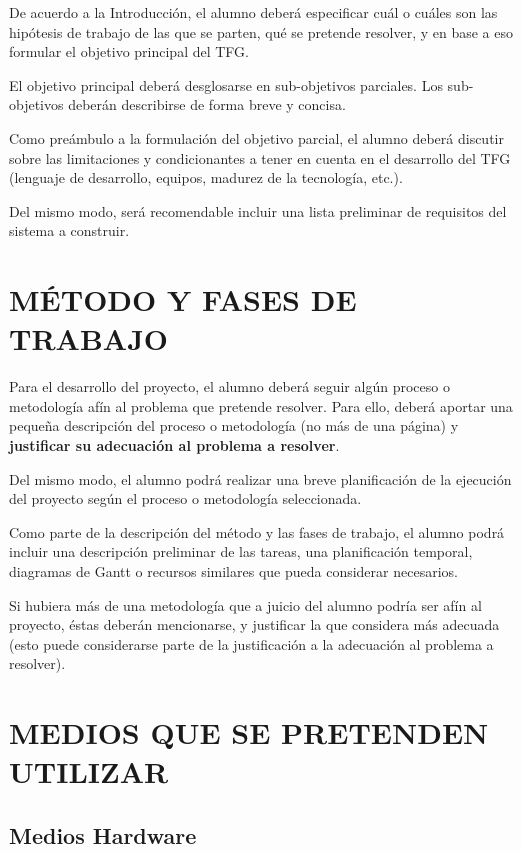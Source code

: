 \documentclass{pre-tfg}
\begin{document}
De acuerdo a la Introducción, el alumno deberá especificar cuál o cuáles son las hipótesis
de trabajo de las que se parten, qué se pretende resolver, y en base a eso formular el
objetivo principal del TFG.

El objetivo principal deberá desglosarse en sub-objetivos parciales. Los sub-objetivos
deberán describirse de forma breve y concisa.

Como preámbulo a la formulación del objetivo parcial, el alumno deberá discutir sobre las
limitaciones y condicionantes a tener en cuenta en el desarrollo del TFG (lenguaje de
desarrollo, equipos, madurez de la tecnología, etc.).

Del mismo modo, será recomendable incluir una lista preliminar de requisitos del sistema a
construir.

\newpage

\section{MÉTODO Y FASES DE TRABAJO}

Para el desarrollo del proyecto, el alumno deberá seguir algún proceso o metodología afín
al problema que pretende resolver. Para ello, deberá aportar una pequeña descripción del
proceso o metodología (no más de una página) y \textbf{justificar su adecuación al
  problema a resolver}.

Del mismo modo, el alumno podrá realizar una breve planificación de la ejecución del
proyecto según el proceso o metodología seleccionada.

Como parte de la descripción del método y las fases de trabajo, el alumno podrá incluir
una descripción preliminar de las tareas, una planificación temporal, diagramas de Gantt o
recursos similares que pueda considerar necesarios.

Si hubiera más de una metodología que a juicio del alumno podría ser afín al proyecto,
éstas deberán mencionarse, y justificar la que considera más adecuada (esto puede
considerarse parte de la justificación a la adecuación al problema a resolver).

\newpage

\section{MEDIOS QUE SE PRETENDEN UTILIZAR}

\subsection{Medios Hardware}
\end{document}
